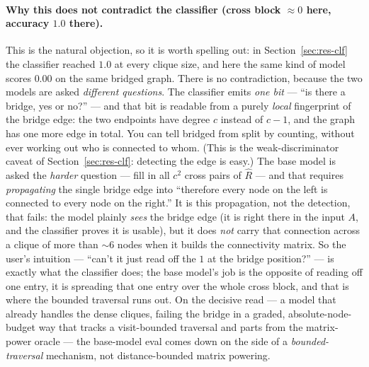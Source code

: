 \documentclass[11pt,a4paper]{article}
\begin{document}
\paragraph{Why this does not contradict the classifier (cross block $\approx 0$ here, accuracy
$1.0$ there).} This is the natural objection, so it is worth spelling out: in
Section~\ref{sec:res-clf} the classifier reached $1.0$ at every clique size, and here the same kind
of model scores $0.00$ on the same bridged graph. There is no contradiction, because the two models
are asked \emph{different questions}. The classifier emits \emph{one bit} --- ``is there a bridge,
yes or no?'' --- and that bit is readable from a purely \emph{local} fingerprint of the bridge edge:
the two endpoints have degree $c$ instead of $c-1$, and the graph has one more edge in total. You
can tell bridged from split by counting, without ever working out who is connected to whom. (This is
the weak-discriminator caveat of Section~\ref{sec:res-clf}: detecting the edge is easy.) The base
model is asked the \emph{harder} question --- fill in all $c^2$ cross pairs of $\hat R$ --- and that
requires \emph{propagating} the single bridge edge into ``therefore every node on the left is
connected to every node on the right.'' It is this propagation, not the detection, that fails:
the model plainly \emph{sees} the bridge edge (it is right there in the input $A$, and the classifier
proves it is usable), but it does \emph{not} carry that connection across a clique of more than
$\sim 6$ nodes when it builds the connectivity matrix. So the user's intuition --- ``can't it just
read off the $1$ at the bridge position?'' --- is exactly what the classifier does; the base model's
job is the opposite of reading off one entry, it is spreading that one entry over the whole cross
block, and that is where the bounded traversal runs out. On the decisive read --- a
model that already handles the dense cliques, failing the bridge in a graded, absolute-node-budget
way that tracks a visit-bounded traversal and parts from the matrix-power oracle --- the base-model
eval comes down on the side of a \emph{bounded-traversal} mechanism, not distance-bounded matrix
powering.
\end{document}
